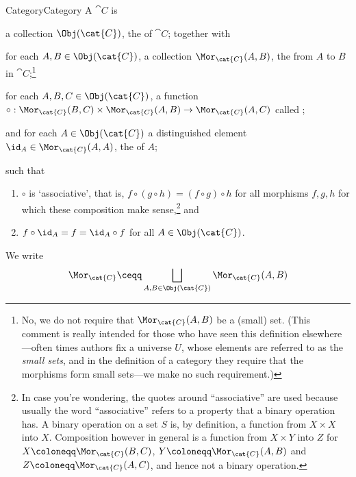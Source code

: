 \begin{dfn}{Category}{Category}
A  $\cat{C}$ is
\begin{data}
\item a collection $\Obj (\cat{C})$, the  of $\cat{C}$; together with
\item for each $A,B\in \Obj (\cat{C})$, a collection $\Mor _{\cat{C}}(A,B)$, the  from $A$ to $B$ in $\cat{C}$;\footnote{No, we do not require that $\Mor _{\cat{C}}(A,B)$ be a (small) set.  (This comment is really intended for those who have seen this definition elsewhere---often times authors fix a universe $U$, whose elements are referred to as the \emph{small sets}, and in the definition of a category they require that the morphisms form small sets---we make no such requirement.)}
\item for each $A,B,C\in \Obj (\cat{C})$, a function $\circ :\Mor _{\cat{C}}(B,C)\times \Mor _{\cat{C}}(A,B)\rightarrow \Mor _{\cat{C}}(A,C)$ called ;
\item and for each $A\in \Obj (\cat{C})$ a distinguished element $\id _{A}\in \Mor _{\cat{C}}(A,A)$, the  of $A$;
\end{data}
such that
\begin{enumerate}
\item $\circ$ is `associative', that is, $f\circ (g\circ h)=(f\circ g)\circ h$ for all morphisms $f,g,h$ for which these composition make sense,\footnote{In case you're wondering, the quotes around ``associative'' are used because usually the word ``associative'' refers to a property that a binary operation has.  A binary operation on a set $S$ is, by definition, a function from $X\times X$ into $X$.  Composition however in general is a function from $X\times Y$ into $Z$ for $X\coloneqq \Mor _{\cat{C}}(B,C)$, $Y\coloneqq \Mor _{\cat{C}}(A,B)$ and $Z\coloneqq \Mor _{\cat{C}}(A,C)$, and hence not a binary operation.} and
\item $f\circ \id _A=f=\id _A\circ f$ for all $A\in \Obj (\cat{C})$.
\end{enumerate}
\begin{rmk}
We write
\begin{equation}
\Mor _{\cat{C}}\ceqq \bigsqcup _{A,B\in \Obj (\cat{C})}\Mor _{\cat{C}}(A,B)
\end{equation}

\end{rmk}
\end{dfn}
